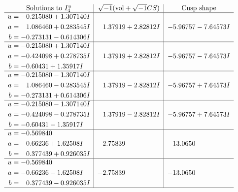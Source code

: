 \documentclass[1p]{elsarticle_modified}
\theoremstyle{definition}
\newcommand{\I}{\sqrt{-1}}
\begin{document}
$$\begin{array}{c|c|c}  
\text{Solutions to }I^u_{4}& \I (\text{vol} + \sqrt{-1}CS) & \text{Cusp shape}\\
 \hline 
\begin{aligned}
u &= -0.215080 + 1.307140 I \\
a &= \phantom{-}1.086460 + 0.283545 I \\
b &= -0.273131 - 0.614306 I\end{aligned}
 & \phantom{-}1.37919 + 2.82812 I & -5.96757 - 7.64573 I \\ \hline\begin{aligned}
u &= -0.215080 + 1.307140 I \\
a &= -0.424098 + 0.278735 I \\
b &= -0.60431 + 1.35917 I\end{aligned}
 & \phantom{-}1.37919 + 2.82812 I & -5.96757 - 7.64573 I \\ \hline\begin{aligned}
u &= -0.215080 - 1.307140 I \\
a &= \phantom{-}1.086460 - 0.283545 I \\
b &= -0.273131 + 0.614306 I\end{aligned}
 & \phantom{-}1.37919 - 2.82812 I & -5.96757 + 7.64573 I \\ \hline\begin{aligned}
u &= -0.215080 - 1.307140 I \\
a &= -0.424098 - 0.278735 I \\
b &= -0.60431 - 1.35917 I\end{aligned}
 & \phantom{-}1.37919 - 2.82812 I & -5.96757 + 7.64573 I \\ \hline\begin{aligned}
u &= -0.569840\phantom{ +0.000000I} \\
a &= -0.66236 + 1.62508 I \\
b &= \phantom{-}0.377439 + 0.926035 I\end{aligned}
 & -2.75839\phantom{ +0.000000I} & -13.0650\phantom{ +0.000000I} \\ \hline\begin{aligned}
u &= -0.569840\phantom{ +0.000000I} \\
a &= -0.66236 - 1.62508 I \\
b &= \phantom{-}0.377439 - 0.926035 I\end{aligned}
 & -2.75839\phantom{ +0.000000I} & -13.0650\phantom{ +0.000000I}\\
 \hline 
 \end{array}$$\newpage
\end{document}
